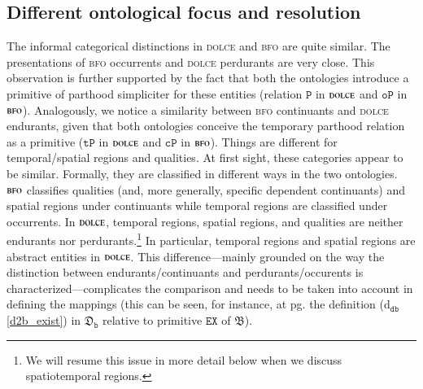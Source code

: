 \documentclass[ao]{iosart2x}
\newcommand{\dbDefLabel}{\textrm{d$_\texttt{db}$}}
\newcommand{\refdbdf}[1]{({\dbDefLabel}\ref{#1})}
\newcommand{\pr}[1]{\mathtt{#1}}
\newcommand{\cn}[1]{\mathtt{#1}}
\newcommand\textequal{%
 \rule[.08ex]{5pt}{0.35pt}\llap{\rule[.78ex]{5pt}{0.35pt}}}
\newcommand{\sdef}{{\hspace{1.5pt}:\hspace{-2.5pt}\textequal\hspace{3pt}}}
\newcommand{\dolce}{{\textsc{dolce}}}
\newcommand{\bfo}{{\textsc{bfo}}}
\newcommand {\thbfo} {\ensuremath{\mathfrak{B}}}
\newcommand {\thdolcedbmap} {\ensuremath{\mathfrak{D}_\texttt{b}}}
\newcommand {\TPd} {\ensuremath{\pr{tP}}}
\newcommand {\Pd} {\ensuremath{\pr{P}}}
\newcommand{\procbcat}{\cn{proc}}
\newcommand{\bfocpart}{\pr{cP}}
\newcommand{\bfoopart}{\pr{oP}}
\newcommand{\bfoexist}{\pr{EX}}
\newcommand{\bfoiof}[1]{{\,::_{#1\:\!}}}
\begin{document}
%


\subsection{Different ontological focus and resolution}\label{sect_diff_resolution}

The informal categorical distinctions in {\dolce} and {\bfo} are quite similar. The presentations of {\bfo} occurrents and {\dolce} perdurants are very close. This observation is further supported by the fact that both the ontologies introduce a primitive of parthood simpliciter for these entities (relation $\Pd$ in {$\dolce$} and $\bfoopart$ in {$\bfo$}). 
Analogously, we notice a similarity between {\bfo} continuants and {\dolce} endurants, given that both ontologies conceive the temporary parthood relation as a primitive ($\TPd$ in {$\dolce$} and $\bfocpart$ in {$\bfo$}).
Things are different for temporal/spatial  regions and qualities. At first sight, these categories appear to be similar. Formally, they are classified in different ways in the two ontologies. 
{$\bfo$} classifies qualities (and, more generally, specific dependent continuants) and spatial regions under continuants while temporal regions are classified under occurrents. In {$\dolce$}, temporal regions, spatial regions, and qualities are neither endurants nor perdurants.\footnote{We will resume this issue in more detail below when we discuss spatiotemporal regions.} In particular, temporal regions and spatial regions are abstract entities in {$\dolce$}. This difference---mainly grounded on the way the distinction between endurants/continuants  and perdurants/occurents is characterized---complicates the comparison and needs to be taken into account in defining the mappings (this can be seen, for instance, at pg. \pageref{d2b_exist} the definition \refdbdf{d2b_exist} in $\thdolcedbmap$ relative to primitive $\bfoexist$ of {$\thbfo$}).      
\end{document}
